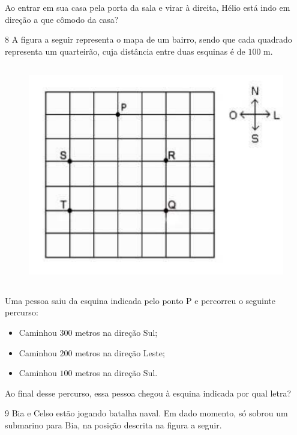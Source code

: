 Ao entrar em sua casa pela porta da sala e virar à direita, Hélio está
indo em direção a que cômodo da casa?


\pagebreak
\num{8}  A figura a seguir representa o mapa de um bairro, sendo que cada
quadrado representa um quarteirão, cuja distância entre duas esquinas é
de $100$ m.

\begin{figure}[H]
\centering\includegraphics[width=4.82569in,height=3.77917in]{./imgSAEB_6_MAT/media/image72.png}
\end{figure}

Uma pessoa saiu da esquina indicada pelo ponto P e percorreu o seguinte
percurso:

\begin{itemize}
\item Caminhou $300$ metros na direção Sul;
\item Caminhou $200$ metros na direção Leste;
\item Caminhou $100$ metros na direção Sul.
\end{itemize}

Ao final desse percurso, essa pessoa chegou à esquina indicada por qual letra?


\pagebreak
\num{9} Bia e Celso estão jogando batalha naval. Em dado momento, só sobrou
um submarino para Bia, na posição descrita na figura a seguir.

